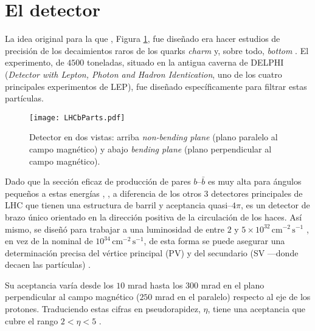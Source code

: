 \section{El detector} %

La idea original para la que \lhcb, Figura \ref{fig:partsLHCb}, fue diseñado era hacer estudios de precisión de los decaimientos raros de los quarks \emph{charm} y, sobre todo, \emph{bottom} \cite{Adeva:1224241,Alves:1129809}. El experimento, de $4500$ toneladas, situado en la antigua caverna de DELPHI (\textit{Detector with Lepton, Photon and Hadron Identication}, uno de los cuatro principales experimentos de LEP), fue diseñado específicamente para filtrar estas partículas. %

\begin{figure}[H]
\texttt{[image: LHCbParts.pdf]}
\caption{Detector \lhcb en dos vistas: arriba \textit{non-bending plane} (plano paralelo al campo magnético) y abajo \textit{bending plane} (plano perpendicular al campo magnético).}	\label{fig:partsLHCb}
\end{figure}

Dado que la sección eficaz de producción de pares $b$--$\bar b$ es muy alta para ángulos pequeños a estas energías 
, \lhcb, a diferencia de los otros 3 detectores principales de LHC que tienen una estructura de barril y aceptancia quasi--$4 \pi$, es un detector de brazo único orientado en la dirección positiva \color{vero} de la circulación de los haces. \color{norm}
%
Así mismo, \lhcb se diseñó para trabajar a una luminosidad de entre $2$ y $5 \times 10^{32} \, \mathrm{cm^{-2}\, s^{-1}}$ \cite{Alves:1129809}, en vez de la nominal de \lhc $ 10^{34} \, \mathrm{cm^{-2}\, s^{-1}}$, de esta forma se puede asegurar una determinación precisa del vértice principal (PV) y del secundario (SV ---donde decaen las partículas) .

Su aceptancia varía desde los
 $10$ mrad hasta los $300$ mrad en el plano perpendicular al campo magnético ($250$ mrad en el paralelo) respecto al eje de los protones. Traduciendo estas cifras en pseudorapidez, $\eta$, \lhcb tiene una aceptancia que cubre el rango $2 < \eta < 5$ \cite{Alves:1129809}.

